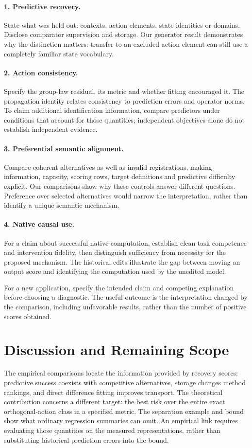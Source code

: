 \documentclass{article}
\begin{document}
\paragraph{1. Predictive recovery.}
State what was held out: contexts, action elements, state identities or domains. Disclose comparator supervision and storage. Our generator result demonstrates why the distinction matters: transfer to an excluded action element can still use a completely familiar state vocabulary.

\paragraph{2. Action consistency.}
Specify the group-law residual, its metric and whether fitting encouraged it. The propagation identity relates consistency to prediction errors and operator norms. To claim additional identification information, compare predictors under conditions that account for those quantities; independent objectives alone do not establish independent evidence.

\paragraph{3. Preferential semantic alignment.}
Compare coherent alternatives as well as invalid registrations, making information, capacity, scoring rows, target definitions and predictive difficulty explicit. Our comparisons show why these controls answer different questions. Preference over selected alternatives would narrow the interpretation, rather than identify a unique semantic mechanism.

\paragraph{4. Native causal use.}
For a claim about successful native computation, establish clean-task competence and intervention fidelity, then distinguish sufficiency from necessity for the proposed mechanism. The historical edits illustrate the gap between moving an output score and identifying the computation used by the unedited model.

For a new application, specify the intended claim and competing explanation before choosing a diagnostic. The useful outcome is the interpretation changed by the comparison, including unfavorable results, rather than the number of positive scores obtained.

\section{Discussion and Remaining Scope}
The empirical comparisons locate the information provided by recovery scores: predictive success coexists with competitive alternatives, storage changes method rankings, and direct difference fitting improves transport. The theoretical contribution concerns a different target: the best risk over the entire exact orthogonal-action class in a specified metric. The separation example and bound show what ordinary regression summaries can omit. An empirical link requires evaluating those quantities on the measured representations, rather than substituting historical prediction errors into the bound.
\end{document}
